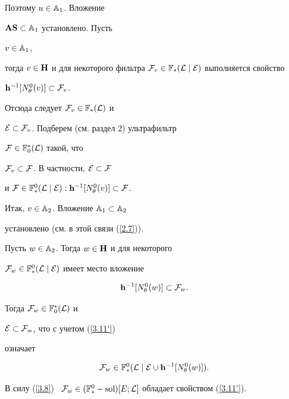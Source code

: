 {\begin{pf}
Поэтому $u \in {{\Bbb A}_1}$. Вложение


${{\bold A}{\bold S}} \subset {{\Bbb A}_1}$ установлено. Пусть


$v \in {{\Bbb A}_1}$,


тогда $v \in {\bold H}$ и для некоторого фильтра ${{\cal F}_v} \in


{{\Bbb F}_*}({\cal L}\mid{\cal E})$ выполняется свойство


${{\bold h}^{-1}}[{N_\theta^0}(v)] \subset {{\cal F}_v}$.


Отсюда следует ${{\cal F}_v} \in {{\Bbb F}_*}({\cal L})$ и


${\cal E} \subset {{\cal F}_v}$. Подберем (см. раздел 2) ультрафильтр


${\cal F} \in {{\Bbb F}_0^*}({\cal L})$ такой, что


${{\cal F}_v} \subset {\cal F}$. В частности, ${\cal E} \subset {\cal F}$


и ${\cal F} \in {{\Bbb F}^0_*}({\cal L}\mid{\cal E}):


{{\bold h}^{-1}}[{N_\theta^0}(v)] \subset {\cal F}$.


Итак, $v \in {{\Bbb A}_2}$. Вложение ${{\Bbb A}_1} \subset {{\Bbb A}_2}$


установлено (см. в этой связи (\ref{2.7})).





Пусть $w \in {{\Bbb A}_2}$. Тогда $w \in {\bold H}$ и для некоторого


${{\cal F}_w} \in {{\Bbb F}_*^0}({\cal L}\mid{\cal E})$ имеет место вложение


\begin{equation}\label{3.11'}


{{\bold h}^{-1}}[{N_\theta^0}(w)] \subset {{\cal F}_w}.


\end{equation}


Тогда ${{\cal F}_w} \in {{\Bbb F}_0^*}({\cal L})$ и


${\cal E} \subset {{\cal F}_w}$, что с учетом (\ref{3.11'})


означает


$$


{{\cal F}_w} \in {{\Bbb F}_*^0}({\cal L}\mid{\cal E}\cup{{\bold


h}^{-1}}[{N_\theta^0}(w)]).


$$


В силу (\ref{3.8}) \ ${{\cal F}_w} \in


({{\Bbb F}_*^0}-\sol)[E;{\cal L}]$ обладает свойством (\ref{3.11'}).



\end{pf}}
